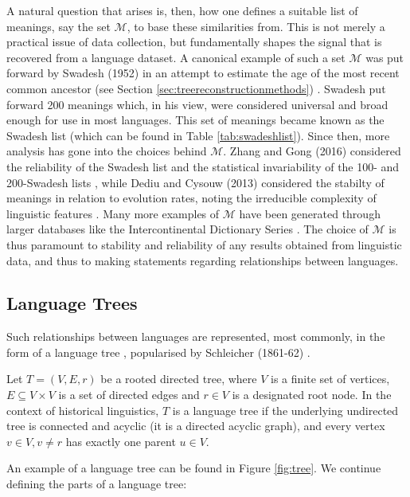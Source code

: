 A natural question that arises is, then, how one defines a suitable list of meanings, say the set $\mathcal{M}$, to base these similarities from. This is not merely a practical issue of data collection, but fundamentally shapes the signal that is recovered from a language dataset. A canonical example of such a set $\mathcal{M}$ was put forward by Swadesh (1952) in an attempt to estimate the age of the most recent common ancestor (see Section \ref{sec:treereconstructionmethods}) \cite{Swadesh1952}. Swadesh put forward 200 meanings which, in his view, were considered universal and broad enough for use in most languages. This set of meanings became known as the Swadesh list (which can be found in Table \ref{tab:swadeshlist}). Since then, more analysis has gone into the choices behind $\mathcal{M}$. Zhang and Gong (2016) considered the reliability of the Swadesh list and the statistical invariability of the 100- and 200-Swadesh lists \cite{Zhang2016}, while Dediu and Cysouw (2013) considered the stabilty of meanings in relation to evolution rates, noting the irreducible complexity of linguistic features \cite{Dediu2013}. Many more examples of $\mathcal{M}$ have been generated through larger databases like the Intercontinental Dictionary Series \cite{Borin2013}. The choice of $\mathcal{M}$ is thus paramount to stability and reliability of any results obtained from linguistic data, and thus to making statements regarding relationships between languages.

\subsection{Language Trees}
\label{sec:trees}
Such relationships between languages are represented, most commonly, in the form of a language tree \cite{Pellard2026}, popularised by Schleicher (1861-62) \cite{Schleicher1861}. 

\begin{definition} 
    Let $T = (V, E, r)$ be a rooted directed tree, where $V$ is a finite set of vertices, $E \subseteq V \times V$ is a set of directed edges and $r \in V$ is a designated root node. In the context of historical linguistics, $T$ is a language tree if the underlying undirected tree is connected and acyclic (it is a directed acyclic graph), and every vertex $v \in V, v \neq r$ has exactly one parent $u \in V$.
\end{definition}

An example of a language tree can be found in Figure \ref{fig:tree}. We continue defining the parts of a language tree:


